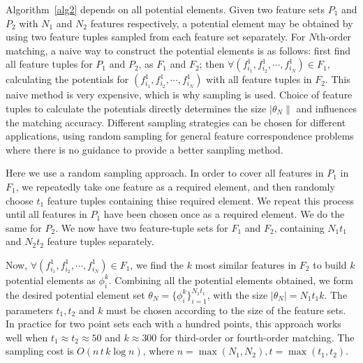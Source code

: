 Algorithm~\ref{alg2} depends on all potential elements.
Given two feature sets $P_1$ and $P_2$ with $N_1$ and $N_2$ features respectively,
a potential element may be obtained by using two feature tuples sampled from each feature set separately.
For $N$th-order matching, a naive way to construct the potential elements is as follows:
first find all feature tuples for $P_1$ and $P_2$, as $F_1$ and $F_2$; then $\forall (f_{i_1}^1, f_{i_2}^1, \cdots, f_{i_N}^1)\in F_1$,
calculating the potentials for $(f_{i_1}^1, f_{i_2}^1, \cdots, f_{i_N}^1)$ with all feature tuples in $F_2$.
This naive method is very expensive, which is why sampling is used.
Choice of feature tuples to calculate the potentials directly determines the size $|\theta_N\|$ and influences the matching accuracy.
Different sampling strategies can be chosen for different applications,
using random sampling for general feature correspondence problems where there is no guidance to provide a better sampling method.

Here we use a random sampling approach. In order to cover all features in $P_1$ in $F_1$,  we repeatedly take one feature as a required element,
and then  randomly choose $t_1$ feature tuples containing thise required element.
We repeat this process until all features in $P_1$ have been chosen once as a required element.
We do the same for $P_2$. We now have two feature-tuple sets for $F_1$ and $F_2$, containing $N_1 t_1$ and $N_2 t_2$ feature tuples separately.

Now, $\forall (f_{i_1}^1, f_{i_2}^1, \cdots, f_{i_N}^1)\in F_1$, we find the $k$ most similar features in $F_2$ to build $k$ potential elements as $\phi_i^k$.
Combining all the potential elements obtained, we form the desired potential element set $\theta_N = \{\phi_i^k\}_{i=1}^{N_1 t_1}$, with the size $|\theta_N| = N_1 t_1 k$.
The parameters $t_1, t_2$ and $k$ must be chosen according to the size of the feature sets. In practice for two point sets each with a hundred points, this approach works well when $t_1 \approx t_2 \approx 50$ and $k \approx 300$ for third-order or fourth-order matching.
The sampling cost is $O(n\, t\,  k\log n)$, where $n=\max(N_1, N_2), t=\max(t_1, t_2)$.

